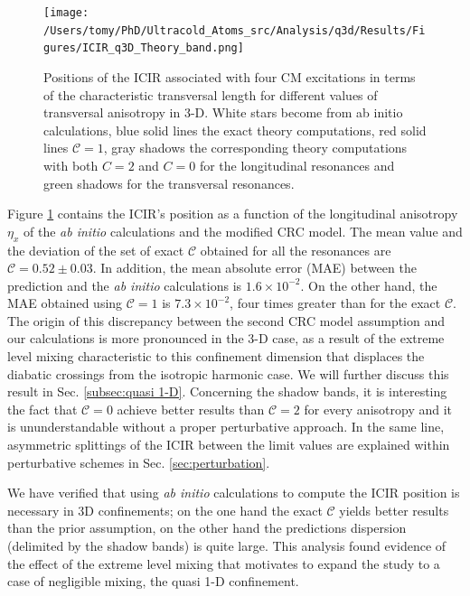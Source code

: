 \documentclass[aps,pre,twocolumn,superscriptaddress,showpacs]{revtex4-1}
\begin{document}
\begin{figure}[htbp!]
 \centering
\texttt{[image: /Users/tomy/PhD/Ultracold\_Atoms\_src/Analysis/q3d/Results/Figures/ICIR\_q3D\_Theory\_band.png]}
 \caption{Positions of the ICIR associated with four CM excitations in terms of the characteristic transversal length for different values of transversal anisotropy in 3-D. White stars become from ab initio calculations, blue solid lines the exact theory computations, red solid lines $\mathcal{C}=1$, gray shadows the corresponding theory computations with both $C=2$ and $C=0$ for the longitudinal resonances and green shadows for the transversal resonances. }
 \label{fig:q3d ICIR}
 \end{figure}

Figure \ref{fig:q3d ICIR} contains the ICIR's position as a function of the longitudinal anisotropy $\eta_x$ of the \textit{ab initio} calculations and the modified CRC model. The mean value and the deviation of the set of exact $\mathcal{C}$ obtained for all the resonances are $\mathcal{C} = 0.52 \pm 0.03$. In addition, the mean absolute error (MAE) between the prediction and the \textit{ab initio} calculations is $1.6 \times 10^{-2}$. On the other hand, the MAE obtained using $\mathcal{C} = 1$ is $7.3 \times 10^{-2}$, four times greater than for the exact $\mathcal{C}$.  The origin of this discrepancy between the second CRC model assumption and our calculations is more pronounced in the 3-D case, as a result of the extreme level mixing characteristic to this confinement dimension that displaces the diabatic crossings from the isotropic harmonic case. We will further discuss this result in Sec. \ref{subsec:quasi 1-D}.  Concerning the shadow bands, it is interesting the fact that $\mathcal{C} = 0$ achieve better results than $\mathcal{C}=2$ for every anisotropy and it is ununderstandable without a proper perturbative approach. In the same line, asymmetric splittings of the ICIR between the limit values are explained within perturbative schemes in Sec. \ref{sec:perturbation}. 
		 
We have verified that using \textit{ab initio} calculations to compute the ICIR position is necessary in 3D confinements; on the one hand the exact $\mathcal{C}$ yields better results than the prior assumption, on the other hand the predictions dispersion (delimited by the shadow bands) is quite large. This analysis found evidence of the effect of the extreme level mixing that motivates to expand the study to a case of negligible mixing, the quasi 1-D confinement.
\end{document}
